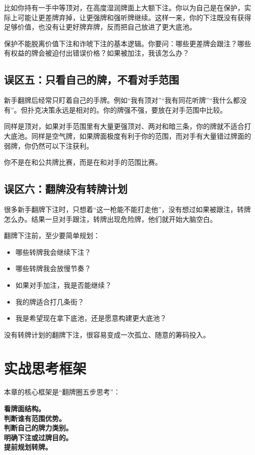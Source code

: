 比如你持有一手中等顶对，在高度湿润牌面上大额下注。你以为自己是在保护，实际上可能让更差牌弃掉，让更强牌和强听牌继续。这样一来，你的下注既没有获得足够价值，也没有让更好牌弃牌，反而把自己放进了更大底池。

保护不能脱离价值下注和诈唬下注的基本逻辑。你要问：哪些更差牌会跟注？哪些有权益的牌会被迫付出错误价格？如果被加注，我该怎么办？

\subsection{误区五：只看自己的牌，不看对手范围}

新手翻牌后经常只盯着自己的手牌。例如“我有顶对”“我有同花听牌”“我什么都没有”。但扑克决策永远是相对的。你的牌强不强，要放在对手范围中比较。

同样是顶对，如果对手范围里有大量更强顶对、两对和暗三条，你的牌就不适合打大底池。同样是空气牌，如果牌面极度有利于你的范围，而对手有大量错过牌面的弱牌，你仍然可以下注获利。

你不是在和公共牌比赛，而是在和对手的范围比赛。

\subsection{误区六：翻牌没有转牌计划}

很多新手翻牌下注时，只想着“这一枪能不能打走他”，没有想过如果被跟注，转牌怎么办。结果一旦对手跟注，转牌出现危险牌，他们就开始大脑空白。

翻牌下注前，至少要简单规划：

\begin{itemize}
\item 哪些转牌我会继续下注？
\item 哪些转牌我会放慢节奏？
\item 如果对手加注，我是否能继续？
\item 我的牌适合打几条街？
\item 我是希望现在拿下底池，还是愿意构建更大底池？
\end{itemize}

没有转牌计划的翻牌下注，很容易变成一次孤立、随意的筹码投入。

\section{实战思考框架}

本章的核心框架是“翻牌圈五步思考”：

\begin{center}
\textbf{看牌面结构。\\
判断谁有范围优势。\\
判断自己的牌力类别。\\
明确下注或过牌目的。\\
提前规划转牌。}
\end{center}

